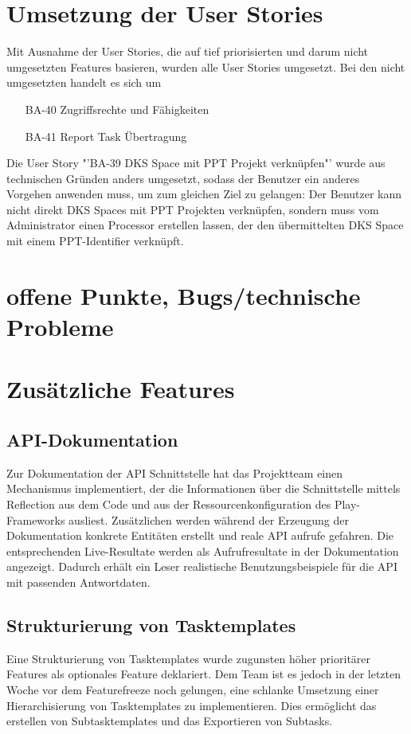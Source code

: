 			
	\section{Umsetzung der User Stories}
		Mit Ausnahme der User Stories, die auf tief priorisierten und darum nicht umgesetzten Features basieren, wurden alle User Stories umgesetzt.
		Bei den nicht umgesetzten handelt es sich um
		\begin{itemize}
			\item[BA-40] Zugriffsrechte und Fähigkeiten
			\item[BA-41] Report Task Übertragung
		\end{itemize}
		
		Die User Story "'BA-39 DKS Space mit PPT Projekt verknüpfen"' wurde aus technischen Gründen anders umgesetzt, 
		sodass der Benutzer ein anderes Vorgehen anwenden muss, um zum gleichen Ziel zu gelangen: Der Benutzer kann nicht direkt DKS Spaces mit PPT Projekten verknüpfen, sondern muss vom Administrator einen Processor erstellen lassen, der den übermittelten DKS Space mit einem PPT-Identifier verknüpft.

	
	\section{offene Punkte, Bugs/technische Probleme}
	
	
	\section{Zusätzliche Features}
		\subsection{API-Dokumentation}
			Zur Dokumentation der API Schnittstelle hat das Projektteam
			einen Mechanismus implementiert, der die Informationen über die Schnittstelle mittels Reflection aus dem Code und aus der Ressourcenkonfiguration des Play-Frameworks ausliest.
			Zusätzlichen werden während der Erzeugung der Dokumentation konkrete Entitäten erstellt und reale API aufrufe gefahren.
			Die entsprechenden Live-Resultate werden als Aufrufresultate in der Dokumentation angezeigt.
			Dadurch erhält ein Leser realistische Benutzungsbeispiele für die API mit passenden Antwortdaten.
			
	
		\subsection{Strukturierung von Tasktemplates}
			Eine Strukturierung von Tasktemplates wurde zugunsten höher prioritärer Features als optionales Feature deklariert.
			Dem Team ist es jedoch in der letzten Woche vor dem Featurefreeze noch gelungen, eine schlanke Umsetzung einer Hierarchisierung von Tasktemplates zu implementieren.
			Dies ermöglicht das erstellen von Subtasktemplates und das Exportieren von Subtasks.
			
